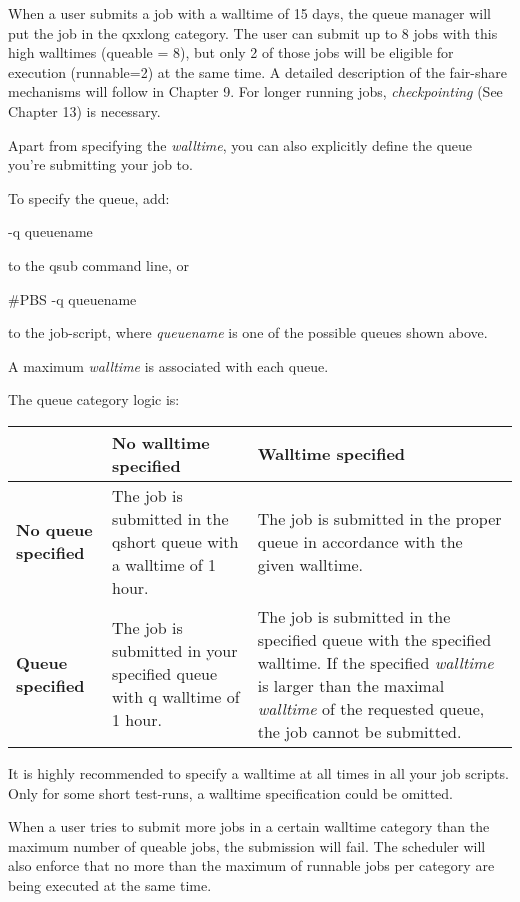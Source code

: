 When a user submits a job with a walltime of 15 days, the queue manager will put the job in the qxxlong category.  The user can submit up to 8 jobs with this high walltimes (queable = 8), but only 2 of those jobs will be eligible for execution (runnable=2) at the same time.  A detailed description of the fair-share mechanisms will follow in Chapter 9. For longer running jobs, \textit{checkpointing} (See Chapter 13) is necessary.

Apart from specifying the \textit{walltime}, you can also explicitly define the queue you're submitting your job to.

To specify the queue, add:
\begin{prompt}
-q queuename
\end{prompt}
to the qsub command line, or
\begin{prompt}
\#PBS -q queuename
\end{prompt}

to the job-script, where \textit{queuename} is one of the possible queues shown above.

A maximum \textit{walltime} is associated with each queue.

The queue category logic is:

\begin{tabular}{|p{0.9in}|p{1.3in}|p{1.7in}|} \hline
\textbf{} & \textbf{No walltime specified} & \textbf{Walltime specified} \\ \hline
\textbf{No queue \newline specified} & The job is submitted in the qshort queue with a walltime of 1 hour. & The job is submitted in the proper queue in accordance with the given walltime. \\ \hline
\textbf{Queue \newline specified} & The job is submitted in your specified queue with q walltime of 1 hour.  & The job is submitted in the specified queue with the specified walltime. If the specified \textit{walltime} is larger than the maximal \textit{walltime} of the requested queue, the job cannot be submitted. \\ \hline
\end{tabular}

 It is highly recommended to specify a walltime at all times in all your job scripts. Only for some short test-runs, a walltime specification could be omitted.

When a user tries to submit more jobs in a certain walltime category than the maximum number of queable jobs, the submission will fail. The scheduler will also enforce that no more than the maximum of runnable jobs per category are being executed at the same time. \underbar{}

